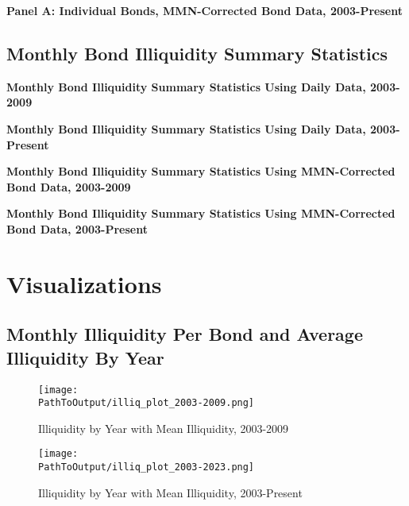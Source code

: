 \documentclass{article}
\newcommand*{\PathToOutput}{../output/}%
\begin{document}
\begin{table}[h!]
\centering
\textbf{\large Panel A: Individual Bonds, MMN-Corrected Bond Data, 2003-Present}
\resizebox{\textwidth}{!}{%
    
}
\label{table:table2_panelA_daily_mmn_new}
\end{table}


\subsection{Monthly Bond Illiquidity Summary Statistics}

\begin{table}
\centering
\textbf{\large Monthly Bond Illiquidity Summary Statistics Using Daily Data, 2003-2009}

\label{table:illiq_summary_paper}
\end{table}


\begin{table}[h!]
\centering
\textbf{\large Monthly Bond Illiquidity Summary Statistics Using Daily Data, 2003-Present}
\resizebox{\textwidth}{!}{%
    
}
\label{table: illiq_summary_new}
\end{table}


\begin{table}
\centering
\textbf{\large Monthly Bond Illiquidity Summary Statistics Using MMN-Corrected Bond Data, 2003-2009}

\label{table:illiq_daily_summary_mmn_paper}
\end{table}


\begin{table}[h!]
\centering
\textbf{\large Monthly Bond Illiquidity Summary Statistics Using MMN-Corrected Bond Data, 2003-Present}
\resizebox{\textwidth}{!}{%
    
}
\label{table: illiq_daily_summary_mmn_new}
\end{table}


\section{Visualizations}

\subsection{Monthly Illiquidity Per Bond and Average Illiquidity By Year}

\begin{figure}
\centering
\caption{Illiquidity by Year with Mean Illiquidity, 2003-2009}
  \centering
  \texttt{[image: \\PathToOutput/illiq\_plot\_2003-2009.png]}

\label{fig:illiq_plot_2003-2009}
\end{figure}


\begin{figure}
\centering
\caption{Illiquidity by Year with Mean Illiquidity, 2003-Present}
  \centering
  \texttt{[image: \\PathToOutput/illiq\_plot\_2003-2023.png]}

\label{fig:illiq_plot_2003-2023}
\end{figure}
\end{document}
